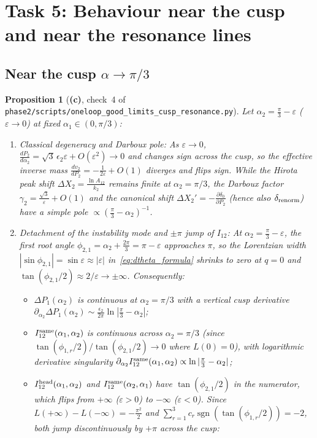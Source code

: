\documentclass[11pt,a4paper]{article}
\newcommand{\Lc}{\textsf{\textbf{(c)}}}
\newcommand{\script}[1]{\texttt{phase2/\allowbreak scripts/\allowbreak #1}}
\newtheorem{proposition}{Proposition}[section]
\theoremstyle{remark}
\begin{document}
\section{Task 5: Behaviour near the cusp and near the resonance lines}\label{sec:task5}

\subsection{Near the cusp $\alpha\to\pi/3$}

\begin{proposition}[\Lc, check~4 of \script{oneloop\_good\_limits\_cusp\_resonance.py}]\label{prop:cusp}
Let $\alpha_2=\frac{\pi}{3}-\varepsilon$ ($\varepsilon\to 0$) at fixed $\alpha_1\in(0,\pi/3)$:
\begin{enumerate}
\item \emph{Classical degeneracy and Darboux pole:} As $\varepsilon\to 0$, $\frac{dP_2}{d\alpha_2}=\sqrt{3}\,\epsilon_2\varepsilon+O(\varepsilon^2)\to 0$ and changes sign across the cusp, so the effective inverse mass $\frac{dv_2}{dP_2}=-\frac{1}{2\varepsilon}+O(1)$ diverges and flips sign. While the Hirota peak shift $\Delta X_2=\frac{\ln A_{12}}{k_2}$ remains finite at $\alpha_2=\pi/3$, the Darboux factor $\gamma_2=\frac{\sqrt{3}}{\varepsilon}+O(1)$ and the canonical shift $\Delta X_2'=-\frac{\partial\delta_0}{\partial P_2}$ (hence also $\delta_{\rm renorm}$) have a \emph{simple pole} $\propto(\frac{\pi}{3}-\alpha_2)^{-1}$.
\item \emph{Detachment of the instability mode and $\pm\pi$ jump of $I_{12}$:} At $\alpha_2=\frac{\pi}{3}-\varepsilon$, the first root angle $\phi_{2,1}=\alpha_2+\frac{2\pi}{3}=\pi-\varepsilon$ approaches $\pi$, so the Lorentzian width $|\sin\phi_{2,1}|=\sin\varepsilon\approx|\varepsilon|$ in~\eqref{eq:dtheta_formula} shrinks to zero at $q=0$ and $\tan(\phi_{2,1}/2)\approx 2/\varepsilon\to\pm\infty$. Consequently:
\begin{itemize}
\item $\Delta P_1(\alpha_2)$ is continuous at $\alpha_2=\pi/3$ with a vertical cusp derivative $\partial_{\alpha_2}\Delta P_1(\alpha_2)\sim\frac{\epsilon_2}{2\pi}\ln|\frac{\pi}{3}-\alpha_2|$;
\item $I_{12}^{\rm same}(\alpha_1,\alpha_2)$ is continuous across $\alpha_2=\pi/3$ (since $\tan(\phi_{1,r}/2)/\tan(\phi_{2,1}/2)\to 0$ where $L(0)=0$), with logarithmic derivative singularity $\partial_{\alpha_2}I_{12}^{\rm same}(\alpha_1,\alpha_2)\propto\ln|\frac{\pi}{3}-\alpha_2|$;
\item $I_{12}^{\rm head}(\alpha_1,\alpha_2)$ and $I_{12}^{\rm same}(\alpha_2,\alpha_1)$ have $\tan(\phi_{2,1}/2)$ in the numerator, which flips from $+\infty$ ($\varepsilon>0$) to $-\infty$ ($\varepsilon<0$). Since $L(+\infty)-L(-\infty)=-\frac{\pi^2}{2}$ and $\sum_{r=1}^3 c_r\operatorname{sgn}(\tan(\phi_{1,r}/2))=-2$, both jump discontinuously by $+\pi$ across the cusp:

\end{itemize}
\end{enumerate}
\end{proposition}
\end{document}
